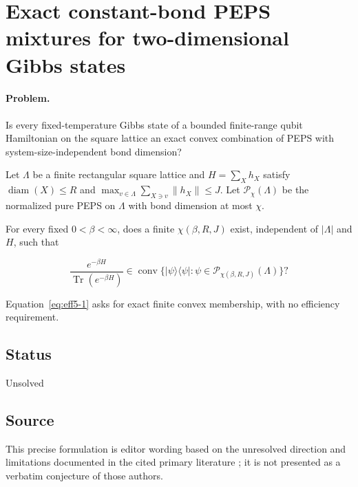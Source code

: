 \section{Exact constant-bond PEPS mixtures for two-dimensional Gibbs states}
\label{sec:op_eff503a05675844e}

\paragraph{Problem.}
Is every fixed-temperature Gibbs state of a bounded finite-range qubit Hamiltonian on the square lattice an exact convex combination of PEPS with system-size-independent bond dimension?

Let $\Lambda$ be a finite rectangular square lattice and $H=\sum_Xh_X$ satisfy $\operatorname{diam}(X)\leq R$ and $\max_{v\in\Lambda}\sum_{X\ni v}\|h_X\|\leq J$. Let $\mathcal P_\chi(\Lambda)$ be the normalized pure PEPS on $\Lambda$ with bond dimension at most $\chi$.

For every fixed $0<\beta<\infty$, does a finite $\chi(\beta,R,J)$ exist, independent of $|\Lambda|$ and $H$, such that

\begin{equation}
\frac{e^{-\beta H}}{\operatorname{Tr}(e^{-\beta H})}
\in\operatorname{conv}\{|\psi\rangle\langle\psi|:
\psi\in\mathcal P_{\chi(\beta,R,J)}(\Lambda)\}?
\label{eq:eff5-1}
\end{equation}

Equation~\eqref{eq:eff5-1} asks for exact finite convex membership, with no efficiency requirement.

\subsection*{Status}

Unsolved

\subsection*{Source}

This precise formulation is editor wording based on the unresolved direction and limitations documented in the cited primary literature ; it is not presented as a verbatim conjecture of those authors.

